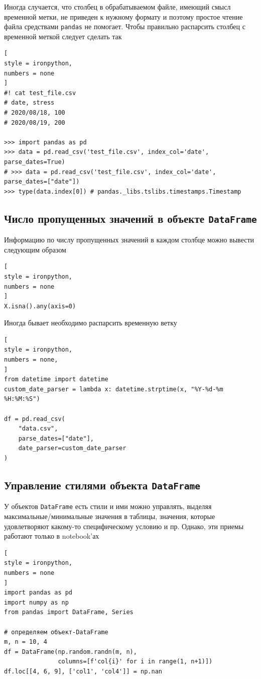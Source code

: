 \documentclass[%
	11pt,
	a4paper,
	utf8,
		]{article}
\begin{document}
Иногда случается, что столбец в обрабатываемом файле, имеющий смысл временной метки, не приведен к нужному формату и поэтому простое чтение файла средствами \texttt{pandas} не помогает. Чтобы правильно распарсить столбец с временной меткой следует сделать так
\begin{lstlisting}[
style = ironpython,
numbers = none
]
#! cat test_file.csv
# date, stress
# 2020/08/18, 100
# 2020/08/19, 200

>>> import pandas as pd
>>> data = pd.read_csv('test_file.csv', index_col='date', parse_dates=True)
# >>> data = pd.read_csv('test_file.csv', index_col='date', parse_dates=["date"])
>>> type(data.index[0]) # pandas._libs.tslibs.timestamps.Timestamp
\end{lstlisting}

\subsection{Число пропущенных значений в объекте \texttt{DataFrame}}

Информацию по числу пропущенных значений в каждом столбце можно вывести следующим образом

\begin{lstlisting}[
style = ironpython,
numbers = none
]
X.isna().any(axis=0)
\end{lstlisting}

Иногда бывает необходимо распарсить временную ветку
\begin{lstlisting}[
style = ironpython,
numbers = none,
]
from datetime import datetime
custom_date_parser = lambda x: datetime.strptime(x, "%Y-%d-%m %H:%M:%S")

df = pd.read_csv(
    "data.csv",
    parse_dates=["date"],
    date_parser=custom_date_parser
)
\end{lstlisting}

\subsection{Управление стилями объекта \texttt{DataFrame}}

У объектов \texttt{DataFrame} есть стили и ими можно управлять, выделяя максимальные/минимальные значения в таблицы, значения, которые удовлетворяют какому-то специфическому условию и пр. Однако, эти приемы работают только в notebook'ах

\begin{lstlisting}[
style = ironpython,
numbers = none
]
import pandas as pd
import numpy as np
from pandas import DataFrame, Series

# определяем объект-DataFrame
m, n = 10, 4
df = DataFrame(np.random.randn(m, n),
               columns=[f'col{i}' for i in range(1, n+1)])
df.loc[[4, 6, 9], ['col1', 'col4']] = np.nan
\end{lstlisting}
\end{document}
